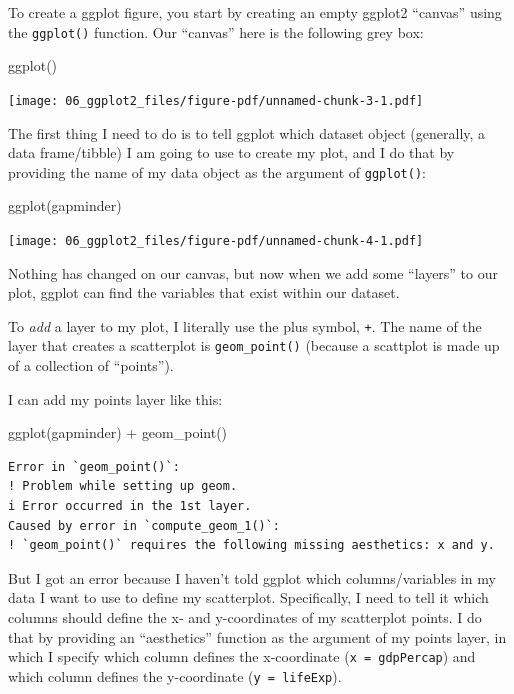 \documentclass[
  letterpaper,
  DIV=11,
  numbers=noendperiod]{scrreprt}
\newenvironment{Shaded}{\begin{snugshade}}{\end{snugshade}}
\newcommand{\FunctionTok}[1]{\textcolor[rgb]{0.28,0.35,0.67}{#1}}
\newcommand{\NormalTok}[1]{\textcolor[rgb]{0.00,0.23,0.31}{#1}}
\newcommand{\SpecialCharTok}[1]{\textcolor[rgb]{0.37,0.37,0.37}{#1}}
\begin{document}
To create a ggplot figure, you start by creating an empty ggplot2
``canvas'' using the \texttt{ggplot()} function. Our ``canvas'' here is
the following grey box:

\begin{Shaded}
\begin{Highlighting}[]
\FunctionTok{ggplot}\NormalTok{()}
\end{Highlighting}
\end{Shaded}

\texttt{[image: 06\_ggplot2\_files/figure-pdf/unnamed-chunk-3-1.pdf]}

The first thing I need to do is to tell ggplot which dataset object
(generally, a data frame/tibble) I am going to use to create my plot,
and I do that by providing the name of my data object as the argument of
\texttt{ggplot()}:

\begin{Shaded}
\begin{Highlighting}[]
\FunctionTok{ggplot}\NormalTok{(gapminder)}
\end{Highlighting}
\end{Shaded}

\texttt{[image: 06\_ggplot2\_files/figure-pdf/unnamed-chunk-4-1.pdf]}

Nothing has changed on our canvas, but now when we add some ``layers''
to our plot, ggplot can find the variables that exist within our
dataset.

To \emph{add} a layer to my plot, I literally use the plus symbol,
\texttt{+}. The name of the layer that creates a scatterplot is
\texttt{geom\_point()} (because a scattplot is made up of a collection
of ``points'').

I can add my points layer like this:

\begin{Shaded}
\begin{Highlighting}[]
\FunctionTok{ggplot}\NormalTok{(gapminder) }\SpecialCharTok{+} \FunctionTok{geom\_point}\NormalTok{()}
\end{Highlighting}
\end{Shaded}

\begin{verbatim}
Error in `geom_point()`:
! Problem while setting up geom.
i Error occurred in the 1st layer.
Caused by error in `compute_geom_1()`:
! `geom_point()` requires the following missing aesthetics: x and y.
\end{verbatim}

But I got an error because I haven't told ggplot which columns/variables
in my data I want to use to define my scatterplot. Specifically, I need
to tell it which columns should define the x- and y-coordinates of my
scatterplot points. I do that by providing an ``aesthetics'' function as
the argument of my points layer, in which I specify which column defines
the x-coordinate (\texttt{x\ =\ gdpPercap}) and which column defines the
y-coordinate (\texttt{y\ =\ lifeExp}).
\end{document}
